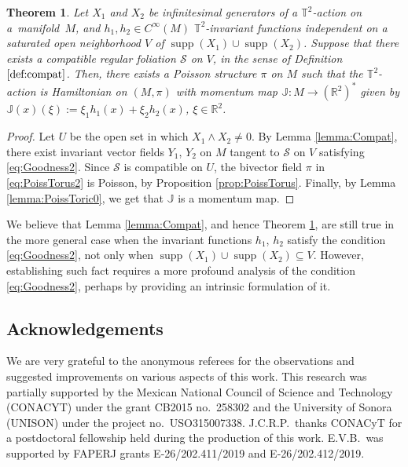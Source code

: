 \documentclass[pdftex]{sigma}%
\newcommand{\R}[1]{\mathbb{R}^{#1}}
\numberwithin{equation}{section}
\newtheorem{Theorem}{Theorem}[section]
\begin{document}
{\sloppy\begin{Theorem}\label{teo:2Torus}
Let $X_1$ and $X_{2}$ be infinitesimal generators of a $\mathbb{T}^{2}$-action on a~manifold~$M$, and $h_{1},h_{2} \in C^{\infty}(M)$ $\mathbb{T}^{2}$-invariant functions independent on a saturated open neighborhood $V$ of $\operatorname{supp}(X_1) \cup \operatorname{supp}(X_2)$. Suppose that there exists a compatible regular foliation $\mathcal{S}$ on $V$, in the sense of Definition $\ref{def:compat}$. Then, there exists a Poisson structure $\pi$ on $M$ such that the $\mathbb{T}^{2}$-action is Hamiltonian on $(M,\pi)$ with momentum map $\mathbb{J}\colon M \to (\R{2})^{*}$ given by $\mathbb{J}(x)(\xi) := \xi_1 h_1(x) + \allowbreak\xi_2h_2(x)$, $\xi \in \R{2}$.
\end{Theorem}}

\begin{proof}
Let $U$ be the open set in which $X_1 \wedge X_2\neq 0$. By Lemma \ref{lemma:Compat}, there exist invariant vector fields $Y_1$, $Y_2$ on $M$ tangent to $\mathcal{S}$ on $V$ satisfying \eqref{eq:Goodness2}. Since $\mathcal{S}$ is compatible on $U$, the bivector field $\pi$ in \eqref{eq:PoissTorus2} is Poisson, by Proposition \ref{prop:PoissTorus}. Finally, by Lemma \ref{lemma:PoissToric0}, we get that $\mathbb{J}$ is a momentum map.
\end{proof}

\begin{Remark}
We believe that Lemma \ref{lemma:Compat}, and hence Theorem \ref{teo:2Torus}, are still true in the more general case when the invariant functions $h_1$, $h_2$ satisfy the condition \eqref{eq:Goodness2}, not only when $\operatorname{supp}(X_1) \cup \operatorname{supp}(X_2) \subseteq V$. However, establishing such fact requires a more profound analysis of the condition \eqref{eq:Goodness2}, perhaps by providing an intrinsic formulation of it.
\end{Remark}

\subsection*{Acknowledgements}

We are very grateful to the anonymous referees for the observations and suggested improvements on various aspects of this work.
This research was partially supported by the Mexican National Council of Science and Technology (CONACYT) under the grant CB2015 no.~258302 and the University of Sonora (UNISON) under the project no.~USO315007338.
J.C.R.P.\ thanks CONACyT for a postdoctoral fellowship held during the production of this work.
E.V.B.\ was supported by FAPERJ grants E-26/202.411/2019 and E-26/202.412/2019.
\end{document}
